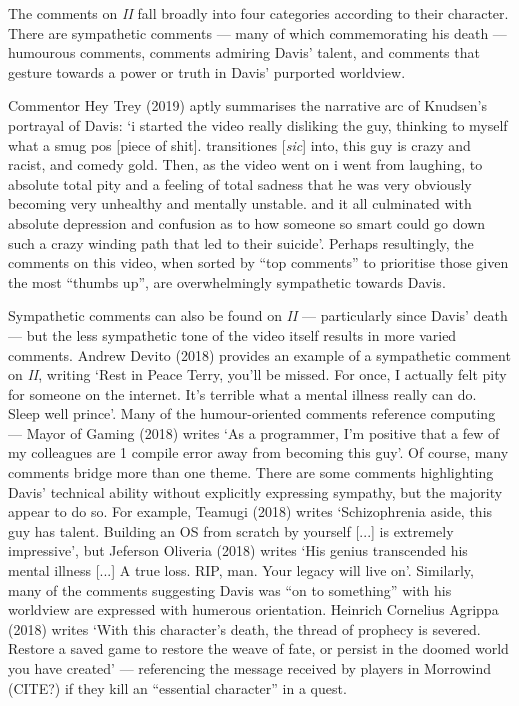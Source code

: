 \documentclass[Draft.tex]{subfiles}
\begin{document}
The comments on \textit{II} fall broadly into four categories according
to their character.
There are sympathetic comments --- many of which commemorating his death ---
humourous comments, comments admiring Davis' talent, and comments that
gesture towards a power or truth in Davis' purported worldview.

Commentor Hey Trey (2019) aptly summarises
the narrative arc of Knudsen's portrayal of Davis:
`i started the video really disliking the guy,
thinking to myself what a smug pos [piece of shit].
transitiones [\textit{sic}] into, this guy is crazy and racist, and comedy gold.
Then, as the video went on i went from laughing, to absolute total pity
and a feeling of total sadness that he was very obviously
becoming very unhealthy and mentally unstable.
and it all culminated with absolute depression and confusion as to
how someone so smart could go down such a crazy winding path
that led to their suicide'.
Perhaps resultingly, the comments on this video, when sorted by ``top comments''
to prioritise those given the most ``thumbs up'',
are overwhelmingly sympathetic towards Davis.

Sympathetic comments can also be found on \textit{II} --- particularly
since Davis' death --- but the less sympathetic tone of the video itself
results in more varied comments.
Andrew Devito (2018) provides an example of a sympathetic comment
on \textit{II}, writing `Rest in Peace Terry, you'll be missed.
For once, I actually felt pity for someone on the internet.
It's terrible what a mental illness really can do. Sleep well prince'.
Many of the humour-oriented comments reference computing ---
Mayor of Gaming (2018) writes `As a programmer, I'm positive that
a few of my colleagues are 1 compile error away from becoming this guy'.
Of course, many comments bridge more than one theme.
There are some comments highlighting Davis' technical ability without
explicitly expressing sympathy, but the majority appear to do so.
For example, Teamugi (2018) writes
`Schizophrenia aside, this guy has talent.
Building an OS from scratch by yourself [...] is extremely impressive',
but Jeferson Oliveria (2018) writes
`His genius transcended his mental illness [...] A true loss.
RIP, man.  Your legacy will live on'.
Similarly, many of the comments suggesting Davis was ``on to something''
with his worldview are expressed with humerous orientation.
Heinrich Cornelius Agrippa (2018) writes `With this character's death,
the thread of prophecy is severed.
Restore a saved game to restore the weave of fate,
or persist in the doomed world you have created' --- referencing the
message received by players in Morrowind (CITE?) if they kill an
``essential character'' in a quest.
\end{document}

